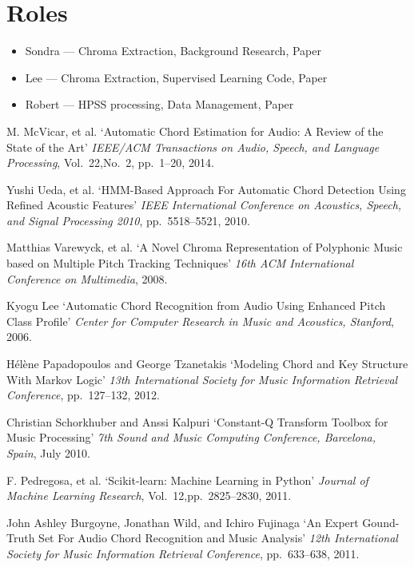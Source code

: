 \documentclass{article}
\begin{document}
\section{Roles}
\begin{itemize}
    \item Sondra --- Chroma Extraction, Background Research, Paper
    \item Lee --- Chroma Extraction, Supervised Learning Code, Paper
    \item Robert --- HPSS processing, Data Management, Paper
\end{itemize}

\begin{thebibliography}{citations}

M. McVicar, et al.
`Automatic Chord Estimation for Audio: A Review of the State of the Art'
{\it IEEE/ACM Transactions on Audio, Speech, and Language Processing},
Vol.~22,No.~2, pp.~1--20, 2014.

Yushi Ueda, et al.
`HMM-Based Approach For Automatic Chord Detection Using Refined Acoustic Features'
{\it IEEE International Conference on Acoustics, Speech, and Signal Processing 2010},
pp.~5518--5521, 2010.

Matthias Varewyck, et al.
`A Novel Chroma Representation of Polyphonic Music based on Multiple Pitch
Tracking Techniques'
{\it 16th ACM International Conference on Multimedia},
2008.

Kyogu Lee
`Automatic Chord Recognition from Audio Using Enhanced Pitch Class Profile'
{\it Center for Computer Research in Music and Acoustics, Stanford},
2006.

Hélène Papadopoulos and George Tzanetakis
`Modeling Chord and Key Structure With Markov Logic'
{\it 13th International Society for Music Information Retrieval Conference},
pp.~127--132, 2012.

Christian Schorkhuber and Anssi Kalpuri
`Constant-Q Transform Toolbox for Music Processing'
{\it 7th Sound and Music Computing Conference, Barcelona, Spain},
July 2010.

F. Pedregosa, et al.
`Scikit-learn: Machine Learning in Python'
{\it Journal of Machine Learning Research},
Vol.~12,pp.~2825--2830, 2011.

John Ashley Burgoyne, Jonathan Wild, and Ichiro Fujinaga
`An Expert Gound-Truth Set For Audio Chord Recognition and Music Analysis'
{\it 12th International Society for Music Information Retrieval Conference},
pp.~633--638, 2011.


\end{thebibliography}
\end{document}
